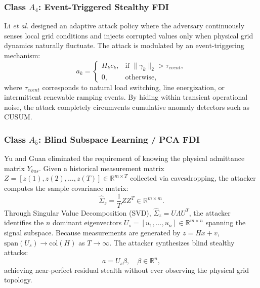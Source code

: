 \documentclass[journal,compsoc]{IEEEtran}
\begin{document}
\subsubsection{Class $A_4$: Event-Triggered Stealthy FDI \cite{ref25, ref76}}
Li \textit{et al.} \cite{ref25} designed an adaptive attack policy where the adversary continuously senses local grid conditions and injects corrupted values only when physical grid dynamics naturally fluctuate. The attack is modulated by an event-triggering mechanism:
\begin{equation}
    a_k = 
    \begin{cases}
        H_k c_k, & \text{if } \|\gamma_k\|_2 > \tau_{event}, \\
        0, & \text{otherwise},
    \end{cases}
\end{equation}
where $\tau_{event}$ corresponds to natural load switching, line energization, or intermittent renewable ramping events. By hiding within transient operational noise, the attack completely circumvents cumulative anomaly detectors such as CUSUM.

\subsubsection{Class $A_5$: Blind Subspace Learning / PCA FDI \cite{ref56, ref31, ref32, ref77}}
Yu and Guan \cite{ref56} eliminated the requirement of knowing the physical admittance matrix $Y_{bus}$. Given a historical measurement matrix $Z = [z(1), z(2), \dots, z(T)] \in \mathbb{R}^{m \times T}$ collected via eavesdropping, the attacker computes the sample covariance matrix:
\begin{equation}
    \hat{\Sigma}_z = \frac{1}{T} Z Z^T \in \mathbb{R}^{m \times m}.
\end{equation}
Through Singular Value Decomposition (SVD), $\hat{\Sigma}_z = U \Lambda U^T$, the attacker identifies the $n$ dominant eigenvectors $U_s = [u_1, \dots, u_n] \in \mathbb{R}^{m \times n}$ spanning the signal subspace. Because measurements are generated by $z = Hx + v$, $\text{span}(U_s) \to \text{col}(H)$ as $T \to \infty$. The attacker synthesizes blind stealthy attacks:
\begin{equation}
    a = U_s \beta, \quad \beta \in \mathbb{R}^n,
\end{equation}
achieving near-perfect residual stealth without ever observing the physical grid topology.
\end{document}
